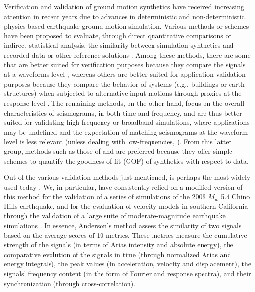 
\introduction

Verification and validation of ground motion synthetics have received increasing attention in recent years due to advances in deterministic and non-deterministic physics-based earthquake ground motion simulation. Various methods or schemes have been proposed to evaluate, through direct quantitative comparisons or indirect statistical analysis, the similarity between simulation synthetics and recorded data or other reference solutions \citep{Anderson_2004_Proc, Kristekova_2006_BSSA, Kristekova_2009_GJI, Olsen_2010_SRL, Burks_BSSA_2014, Rezaeian_2015_BSSA}. Among these methods, there are some that are better suited for verification purposes because they compare the signals at a waveforms level \citep{Kristekova_2006_BSSA, Kristekova_2009_GJI}, whereas others are better suited for application validation purposes because they compare the behavior of systems (e.g., buildings or earth structures) when subjected to alternative input motions through proxies at the response level \citep{Burks_BSSA_2014}. The remaining methods, on the other hand, focus on the overall characteristics of seismograms, in both time and frequency, and are thus better suited for validating high-frequency or broadband simulations, where applications may be undefined and the expectation of matching seismograms at the waveform level is less relevant (unless dealing with low-frequencies, ). From this latter group, methods such as those of \citet{Anderson_2004_Proc} and \citet{Olsen_2010_SRL} are preferred because they offer simple schemes to quantify the goodness-of-fit (GOF) of synthetics with respect to data.

Out of the various validation methods just mentioned, \citet{Anderson_2004_Proc} is perhaps the most widely used today \citep[e.g.,]{Chaljub_2010_BSSA, Bielak_2010_GJI, Guidotti_2011_SRL, Maufroy_2015_BSSA}. We, in particular, have consistently relied on a modified version of this method for the validation of a series of simulations of the 2008 $M_w$ 5.4 Chino Hills earthquake, and for the evaluation of velocity models in southern California through the validation of a large suite of moderate-magnitude earthquake simulations \citep{Taborda_2013_BSSA, Taborda_2014_BSSA, Taborda_2016_GJI}. In essence, Anderson's method assess the similarity of two signals based on the average scores of 10 metrics. These metrics measure the cumulative strength of the signals (in terms of Arias intensity and absolute energy), the comparative evolution of the signals in time (through normalized Arias and energy integrals), the peak values (in acceleration, velocity and displacement), the signals' frequency content (in the form of Fourier and response spectra), and their synchronization (through cross-correlation). 

